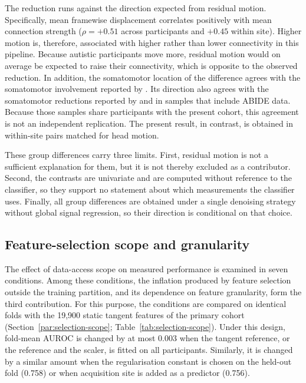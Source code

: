 The reduction runs against the direction expected from residual motion. Specifically, mean
framewise displacement correlates positively with mean connection strength ($\rho=+0.51$
across participants and $+0.45$ within site). Higher motion is, therefore, associated with
higher rather than lower connectivity in this pipeline. Because autistic participants move
more, residual motion would on average be expected to raise their connectivity, which is
opposite to the observed reduction. In addition, the somatomotor location of the difference
agrees with the somatomotor involvement reported by \citet{Chenetal2015}. Its direction
also agrees with the somatomotor reductions reported by \citet{Holigaetal2019} and
\citet{Ilioskaetal2023} in samples that include ABIDE data. Because those samples 
share participants with the present cohort, this agreement is not an independent
replication. The present result, in contrast, is obtained in within-site pairs matched for
head motion.

These group differences carry three limits. First, residual motion is not a sufficient
explanation for them, but it is not thereby excluded as a contributor. Second, the
contrasts are univariate and are computed without reference to the classifier, so they
support no statement about which measurements the classifier uses. Finally, all group
differences are obtained under a single denoising strategy without global signal
regression, so their direction is conditional on that choice.

\subsection{Feature-selection scope and granularity}
\label{subsec:results-selection-scope}

The effect of data-access scope on measured performance is examined in seven conditions.
Among these conditions, the inflation produced by feature selection outside the training
partition, and its dependence on feature granularity, form the third contribution. For
this purpose, the conditions are compared on identical folds with the 19,900 static tangent
features of the primary cohort (Section~\ref{par:selection-scope}; Table~\ref{tab:selection-scope}). Under
this design, fold-mean AUROC is changed by at most 0.003 when the tangent reference, or the
reference and the scaler, is fitted on all participants. Similarly, it is changed by a
similar amount when the regularisation constant is chosen on the held-out fold (0.758) or
when acquisition site is added as a predictor (0.756).

